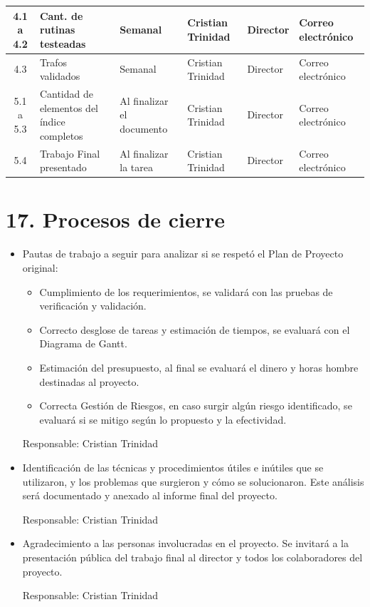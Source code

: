 \documentclass[11pt]{charter}
\begin{document}
\begin{table}[!htpb]
\begin{tabularx}{\linewidth}{@{}|c|X|X|X|X|X|@{}}
4.1 a 4.2 & Cant. de rutinas testeadas & Semanal & Cristian \newline Trinidad & Director & Correo electrónico \\ \hline
4.3 & Trafos validados & Semanal & Cristian \newline Trinidad & Director & Correo electrónico \\ \hline
5.1 a 5.3 & Cantidad de elementos del índice completos & Al finalizar el documento & Cristian \newline Trinidad & Director & Correo electrónico \\ \hline
5.4 & Trabajo Final presentado & Al finalizar la tarea & Cristian \newline Trinidad & Director & Correo electrónico \\ \hline
\end{tabularx}%
\end{table}


\section{17. Procesos de cierre}    
\label{sec:cierre}

\begin{itemize}
\item Pautas de trabajo a seguir para analizar si se respetó el Plan de Proyecto original:
\begin{itemize}
\item Cumplimiento de los requerimientos, se validará con las pruebas de verificación y validación.
\item Correcto desglose de tareas y estimación de tiempos, se evaluará con el Diagrama de Gantt.
\item Estimación del presupuesto, al final se evaluará el dinero y horas hombre destinadas al proyecto.
\item Correcta Gestión de Riesgos, en caso surgir algún riesgo identificado, se evaluará si se mitigo según lo propuesto y la efectividad.
\end{itemize}
Responsable: Cristian Trinidad

\item Identificación de las técnicas y procedimientos útiles e inútiles que se utilizaron, y los problemas que surgieron y cómo se solucionaron. Este análisis será documentado y anexado al informe final del proyecto.

Responsable: Cristian Trinidad

\item Agradecimiento a las personas involucradas en el proyecto. Se invitará a la presentación pública del trabajo final al director y todos los colaboradores del proyecto.

Responsable: Cristian Trinidad

\end{itemize}
\end{document}
